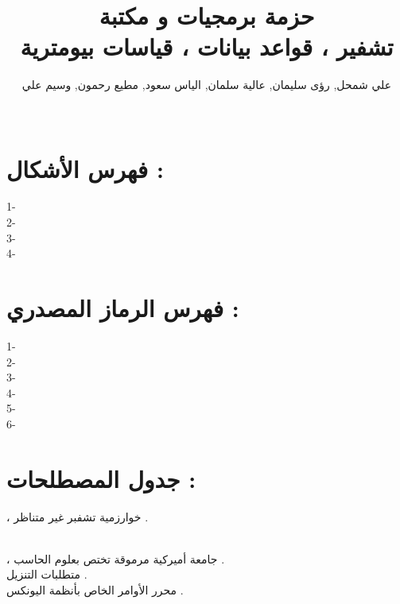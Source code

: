 \documentclass[11pt,a4paper]{report}
\title{
    \Huge\textsc{ حزمة برمجيات و مكتبة  \textLR{EnDaBi} 
    \\
    تشفير ، قواعد بيانات ، قياسات بيومترية}
}
\author{علي شمحل, رؤى سليمان, عالية سلمان, الياس سعود, مطيع رحمون, وسيم علي
\\
\\
\textit{\textRL{بإشراف المهندس : سامي أبوبالا}} }
\begin{document}
\maketitle
\tableofcontents
\chapter{فهرس الأشكال :}
\begin{otherlanguage}{arabic}
\begin{flushleft}
1- \textit{} 
\\
2- \textit{}
\\
3- \textit{}
\\
4-\textit{ }
\end{flushleft}
\end{otherlanguage}

\chapter{فهرس الرماز المصدري :}
\begin{otherlanguage}{arabic}
\begin{flushleft}
1-\textit{ }
\\
2-\textit{ }
\\
3-\textit{ }
\\
4-\textit{ }
\\
5-\textit{ }
\\
6-\textit{ }

\end{flushleft}
\end{otherlanguage}

\chapter{جدول المصطلحات :}
\begin{otherlanguage}{language}
\begin{flushleft}
\underline{} \textit{} ، خوارزمية تشفبر غير متناظر .

\\
\underline{} \textit{} ،
جامعة أميركية مرموقة تختص بعلوم الحاسب .
\\
\underline{} متطلبات التنزيل .
\\
\underline{} محرر الأوامر الخاص بأنظمة اليونكس .


\end{flushleft}
\end{otherlanguage}
\end{document}
